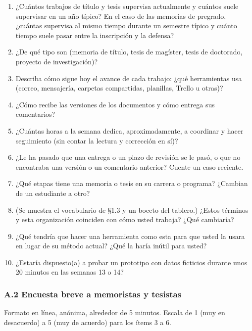 \documentclass[10pt,a4paper]{article}
\begin{document}
\begin{enumerate}[leftmargin=18pt,itemsep=1pt,topsep=2pt]
\item ¿Cuántos trabajos de título y tesis supervisa actualmente y cuántos suele supervisar en un año típico? En el caso de las memorias de pregrado, ¿cuántas supervisa al mismo tiempo durante un semestre típico y cuánto tiempo suele pasar entre la inscripción y la defensa?
\item ¿De qué tipo son (memoria de título, tesis de magíster, tesis de doctorado, proyecto de investigación)?
\item Describa cómo sigue hoy el avance de cada trabajo: ¿qué herramientas usa (correo, mensajería, carpetas compartidas, planillas, Trello u otras)?
\item ¿Cómo recibe las versiones de los documentos y cómo entrega sus comentarios?
\item ¿Cuántas horas a la semana dedica, aproximadamente, a coordinar y hacer seguimiento (sin contar la lectura y corrección en sí)?
\item ¿Le ha pasado que una entrega o un plazo de revisión se le pasó, o que no encontraba una versión o un comentario anterior? Cuente un caso reciente.
\item ¿Qué etapas tiene una memoria o tesis en su carrera o programa? ¿Cambian de un estudiante a otro?
\item (Se muestra el vocabulario de §1.3 y un boceto del tablero.) ¿Estos términos y esta organización coinciden con cómo usted trabaja? ¿Qué cambiaría?
\item ¿Qué tendría que hacer una herramienta como esta para que usted la usara en lugar de su método actual? ¿Qué la haría inútil para usted?
\item ¿Estaría dispuesto(a) a probar un prototipo con datos ficticios durante unos 20 minutos en las semanas 13 o 14?
\end{enumerate}

\subsubsection*{A.2 Encuesta breve a memoristas y tesistas}
Formato en línea, anónima, alrededor de 5 minutos. Escala de 1 (muy en desacuerdo) a 5 (muy de acuerdo) para los ítems 3 a 6.
\end{document}
